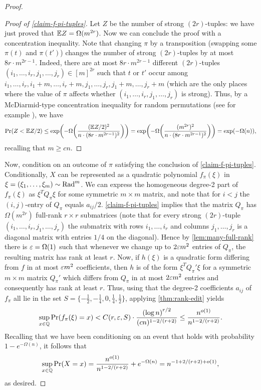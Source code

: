 \documentclass{daj}
\theoremstyle{plain}
\theoremstyle{plain}
\theoremstyle{plain}
\theoremstyle{plain}
\theoremstyle{definition}
\theoremstyle{plain}
\theoremstyle{plain}
\theoremstyle{definition}
\theoremstyle{definition}
\theoremstyle{plain}
\let\originalleft\left
\let\originalright\right
\renewcommand{\left}{\mathopen{}\mathclose\bgroup\originalleft}
\renewcommand{\right}{\aftergroup\egroup\originalright}
\begin{document}
\begin{proof}
\begin{proof}[Proof of \cref{claim-f-pi-tuples}]
Let $Z$ be the number of strong $(2r)$-tuples: we have just proved that $\mathbb{E} Z=\Omega(m^{2r})$. Now we can conclude the proof with a concentration
inequality. Note that changing $\pi$ by a transposition (swapping some $\pi(t)$ and $\pi(t')$) changes the number of strong $(2r)$-tuples by at most $8r\cdot m^{2r-1}$. Indeed, there are at most $8r\cdot m^{2r-1}$ different $(2r)$-tuples $(i_1,\dots,i_r,j_1,\dots,j_r)\in [m]^{2r}$ such that $t$ or $t'$ occur among $i_1,\dots,i_r,i_1+m,\dots, i_r+m,j_1,\dots,j_r, j_1+m,\dots, j_r+m$ (which are the only places where the value of $\pi$ affects whether $(i_1,\dots,i_r,j_1,\dots,j_r)$ is strong). Thus, by a McDiarmid-type concentration inequality for random permutations (see for example \cite[Section 3.2]{McD98}), we have
\[\Pr(Z< \E Z/2)\le \exp\left(-\Omega\left(\frac{(\E Z/2)^2}{n\cdot (8r\cdot m^{2r-1})^2}\right)\right)=\exp\left(-\Omega\left(\frac{(m^{2r})^2}{n\cdot (8r\cdot m^{2r-1})^2}\right)\right)=\exp(-\Omega(n)),\]
recalling that $m\geq cn$.
\end{proof}

Now, condition on an outcome of $\pi$ satisfying the conclusion of \cref{claim-f-pi-tuples}. Conditionally, $X$ can be represented as a quadratic polynomial $f_{\pi}(\xi)$ in $\xi=(\xi_1,\dots,\xi_m)\sim\operatorname{Rad}^m$. We can express the homogeneous degree-2 part of $f_\pi(\xi)$ as $\xi^T Q_{\pi} \xi$ for some symmetric $m\times m$ matrix, and note that for $i< j$ the $(i,j)$-entry of $Q_{\pi}$ equals $a_{ij}/2$. \cref{claim-f-pi-tuples} implies that the matrix $Q_\pi$ has $\Omega(m^{2r})$ full-rank $r\times r$ submatrices (note that for every strong $(2r)$-tuple $(i_1,\dots,i_r,j_1,\dots,j_r)$ the submatrix with rows $i_1,\dots,i_r$ and columns $j_1,\dots,j_r$ is a diagonal matrix with entries $1/4$ on the diagonal). Hence by \cref{lem:many-full-rank} there is $\varepsilon=\Omega(1)$ such that whenever we change up to $2\varepsilon m^2$ entries of $Q_{\pi}$, the resulting matrix has rank at least $r$. Now, if $h(\xi)$ is a quadratic form differing from $f$ in at most $\varepsilon m^2$ coefficients, then $h$ is of the form $\xi^T Q_{\pi}' \xi$ for a symmetric $m\times m$ matrix $Q_\pi'$ which differs from $Q_{\pi}$ in at most $2\varepsilon m^2$ entries and consequently has rank at least $r$. Thus, using that the degree-2 coefficients $a_{ij}$ of $f_{\pi}$ all lie in the set $S=\lbrace -\frac{1}{2}, -\frac{1}{4}, 0, \frac{1}{4}, \frac{1}{2}\rbrace$, applying \cref{thm:rank-edit} yields
\[\sup_{x\in \QQ}\Pr\left(f_\pi(\xi)=x\right)<C(r,\eps, S)\cdot \frac{\left(\log n\right)^{r/2}}{(cn)^{1-2/\left(r+2\right)}}\le \frac{n^{o(1)}}{n^{1-2/\left(r+2\right)}}.\]
Recalling that we have been conditioning on an event that holds with probability $1-e^{-\Omega(n)}$, it follows that
\[\sup_{x\in \QQ}\Pr\left(X=x\right)=\frac{n^{o(1)}}{n^{1-2/\left(r+2\right)}}+e^{-\Omega(n)}=n^{-1+2/(r+2)+o(1)},\]
as desired.
\end{proof}
\end{document}
